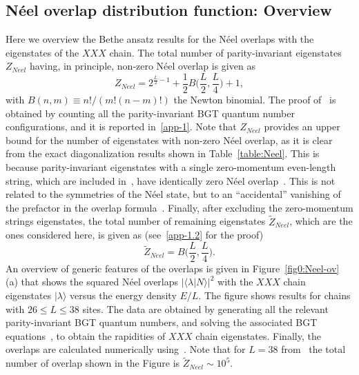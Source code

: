 \documentclass[11pt]{iopart}
\begin{document}
\subsection{N\'eel overlap distribution function: Overview}
\label{sec:5.1}

Here we overview the Bethe ansatz results for the N\'eel overlaps with the 
eigenstates of the $XXX$ chain. The total number of parity-invariant 
eigenstates $Z_{Neel}$ having, in principle, non-zero N\'eel overlap is given 
as 
%
\begin{equation}
\label{zNeel1}
Z_{Neel}=2^{\frac{L}{2}-1}+\frac{1}{2}B\Big(\frac{L}{2},\frac{L}{4}\Big)+1, 
\end{equation}
%
with $B(n,m)\equiv n!/(m!(n-m)!)$ the Newton binomial. The proof of~ 
is obtained by counting all the parity-invariant BGT quantum number configurations, 
and it is reported in~\ref{app-1}. Note that $Z_{Neel}$ provides  an upper 
bound for the number of eigenstates with non-zero N\'eel overlap, as it is clear 
from the exact diagonalization results shown in Table~\ref{table:Neel}. This is 
because parity-invariant eigenstates with a single zero-momentum even-length 
string, which are included in~, have identically zero N\'eel 
overlap~\cite{brockmann-2014}. This is not related to the symmetries of the N\'eel 
state, but to an ``accidental'' vanishing of the prefactor in the overlap 
formula~. Finally, after excluding the zero-momentum strings 
eigenstates, the total number of remaining eigenstates $\widetilde Z_{Neel}$, 
which are the ones considered here, is given as (see~\ref{app-1.2} for the proof) 
%
\begin{equation}
\label{ztilde}
\widetilde Z_{Neel}=B\Big(\frac{L}{2},\frac{L}{4}\Big).
\end{equation}
%
An overview of generic features of the overlaps is given in Figure~\ref{fig0:Neel-ov} 
(a) that shows  the squared N\'eel overlaps $|\langle\lambda|N\rangle|^2$ with the $XXX$ 
chain eigenstates $|\lambda\rangle$ versus the energy density $E/L$. The figure shows 
results for chains with $26\le L\le 38$ sites. The data are obtained by generating all 
the relevant parity-invariant BGT quantum numbers, and solving the associated BGT 
equations~, to obtain the rapidities of $XXX$ chain eigenstates. Finally, 
the overlaps are calculated numerically using~. Note that for $L=38$ 
from~ the total number of overlap shown in the Figure is $\widetilde Z_{Neel}
\sim 10^5$. 
\end{document}
